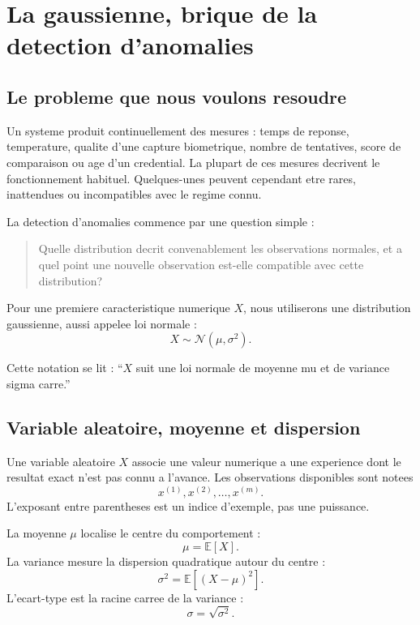 \chapter{La gaussienne, brique de la detection d'anomalies}
\label{chap:gaussian}

\section{Le probleme que nous voulons resoudre}

Un systeme produit continuellement des mesures : temps de reponse, temperature,
qualite d'une capture biometrique, nombre de tentatives, score de comparaison ou
age d'un credential. La plupart de ces mesures decrivent le fonctionnement
habituel. Quelques-unes peuvent cependant etre rares, inattendues ou
incompatibles avec le regime connu.

La detection d'anomalies commence par une question simple :

\begin{quote}
Quelle distribution decrit convenablement les observations normales, et a quel
point une nouvelle observation est-elle compatible avec cette distribution?
\end{quote}

Pour une premiere caracteristique numerique $X$, nous utiliserons une
distribution gaussienne, aussi appelee loi normale :
\begin{equation}
X\sim\mathcal N(\mu,\sigma^2).
\end{equation}

Cette notation se lit : ``$X$ suit une loi normale de moyenne mu et de variance
sigma carre.''

\section{Variable aleatoire, moyenne et dispersion}

Une variable aleatoire $X$ associe une valeur numerique a une experience dont
le resultat exact n'est pas connu a l'avance. Les observations disponibles sont
notees
\begin{equation}
x^{(1)},x^{(2)},\ldots,x^{(m)}.
\end{equation}
L'exposant entre parentheses est un indice d'exemple, pas une puissance.

La moyenne $\mu$ localise le centre du comportement :
\begin{equation}
\mu=\mathbb E[X].
\end{equation}
La variance mesure la dispersion quadratique autour du centre :
\begin{equation}
\sigma^2=\mathbb E[(X-\mu)^2].
\end{equation}
L'ecart-type est la racine carree de la variance :
\begin{equation}
\sigma=\sqrt{\sigma^2}.
\end{equation}

